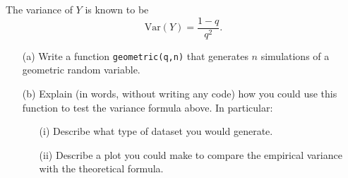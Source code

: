 \begin{exercise}
\begin{exercise}
The variance of $Y$ is known to be
\[
\mathrm{Var}(Y) = \frac{1-q}{q^2}.
\]

\begin{enumerate}
    \item[(a)] Write a function \texttt{geometric(q,n)} that generates $n$ simulations of a geometric random variable. 
    \item[(b)] Explain (in words, without writing any code) how you could use this function to test the variance formula above. In particular:  
    \begin{enumerate}
        \item[(i)] Describe what type of dataset you would generate.  
        \item[(ii)] Describe a plot you could make to compare the empirical variance with the theoretical formula.  
    \end{enumerate}
\end{enumerate}
\end{exercise}





\end{exercise}





 


  
  
 
 